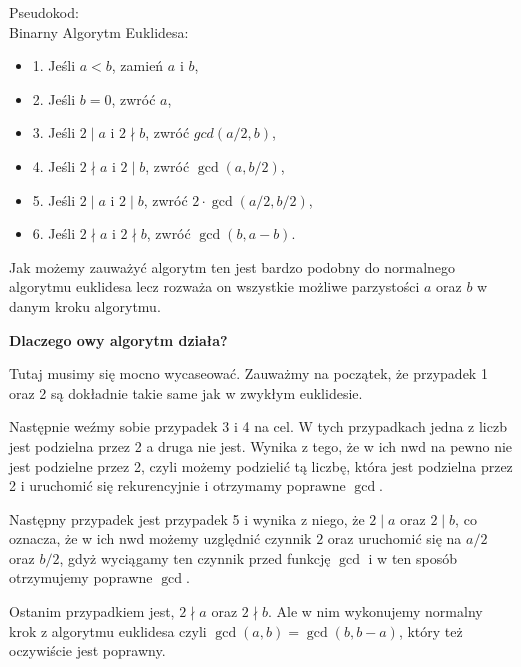 Pseudokod: \\
Binarny Algorytm Euklidesa:
\begin{itemize}
    \item 1. Jeśli $a < b$, zamień $a$ i $b$,
    
    \item 2. Jeśli $b = 0$, zwróć $a$,
    
    \item 3. Jeśli $2 \mid a$ i $2 \nmid b$, zwróć $gcd(a/2, b)$,
    
    \item 4. Jeśli $2 \nmid a$ i $2 \mid b$, zwróć $\gcd(a, b/2)$,
    
    \item 5. Jeśli $2 \mid a$ i $2 \mid b$, zwróć $2 \cdot \gcd(a/2, b/2)$, 
    
    \item 6. Jeśli $2 \nmid a$ i $2 \nmid b$, zwróć $\gcd(b, a - b)$.
\end{itemize}

Jak możemy zauważyć algorytm ten jest bardzo podobny do normalnego algorytmu euklidesa lecz rozważa on wszystkie możliwe parzystości $a$ oraz $b$ w danym kroku algorytmu.
\newline

\textbf{Dlaczego owy algorytm działa?} \newline 

Tutaj musimy się mocno wycaseować. Zauważmy na początek, że przypadek 1 oraz 2 są dokładnie takie same jak w zwykłym euklidesie.\newline 

Następnie weźmy sobie przypadek 3 i 4 na cel. W tych przypadkach jedna z liczb jest podzielna przez 2 a druga nie jest. Wynika z tego, że w ich nwd na pewno nie jest podzielne przez 2, czyli możemy podzielić tą liczbę, która jest podzielna przez 2 i uruchomić się rekurencyjnie i otrzymamy poprawne $\gcd$.


Następny przypadek jest przypadek 5 i wynika z niego, że $2 \mid a$ oraz $2 \mid b$, co oznacza, że w ich nwd możemy uzględnić czynnik $2$ oraz uruchomić się na $a/2$ oraz $b/2$, gdyż wyciągamy ten czynnik przed funkcję $\gcd$ i w ten sposób otrzymujemy poprawne $\gcd$.



Ostanim przypadkiem jest, $2 \nmid a$ oraz $2 \nmid b$. Ale w nim wykonujemy normalny krok z algorytmu euklidesa czyli $\gcd(a,b) = \gcd(b,b-a)$, który też oczywiście jest poprawny.



